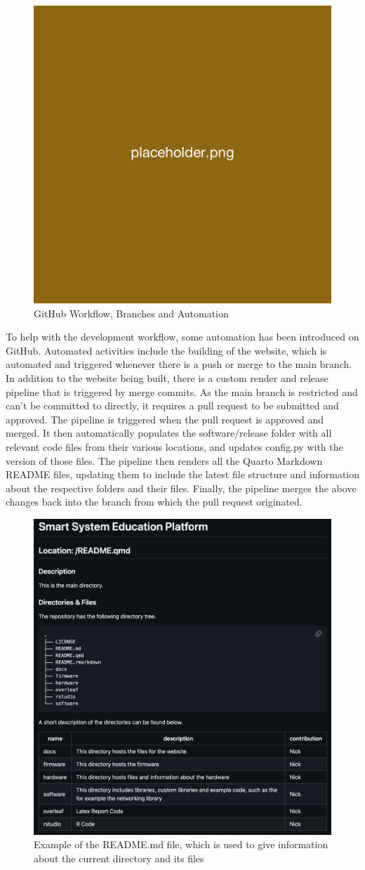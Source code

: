 \begin{figure}[H]
    \centering
    \includegraphics[width=0.5\linewidth]{overleaf/images/placeholder.png}
    \vspace{\ftspace}
    \caption{GitHub Workflow, Branches and Automation}
    \label{fig:enter-label}
\end{figure}

To help with the development workflow, some automation has been introduced on GitHub. Automated activities include the building of the website, which is automated and triggered whenever there is a push or merge to the main branch. In addition to the website being built, there is a custom render and release pipeline that is triggered by merge commits. As the main branch is restricted and can't be committed to directly, it requires a pull request to be submitted and approved. The pipeline is triggered when the pull request is approved and merged. It then automatically populates the software/release folder with all relevant code files from their various locations, and updates config.py with the version of those files. The pipeline then renders all the Quarto Markdown README files, updating them to include the latest file structure and information about the respective folders and their files. Finally, the pipeline merges the above changes back into the branch from which the pull request originated.

\begin{figure}[H]
    \centering
    \includegraphics[width=0.5\linewidth]{overleaf/images/readme.png}
    \vspace{\ftspace}
    \caption{Example of the README.md file, which is used to give information about the current directory and its files}
    \vspace{\ftspace}
    \label{fig:readme}
\end{figure}

